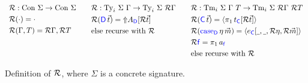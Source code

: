 \begin{figure}[h]
  \[
    \begin{array}[t]{ccc}
      \begin{aligned}[t]
         & \mathcal{R} {}          : \textrm{Con} \ \Sigma  \to \textrm{Con} \ \Sigma \\
         & \mathcal{R} {(\cdot)}     = \cdot                          \\
         & \mathcal{R} {(\Gamma, T)} = \mathcal{R} {\Gamma}, \mathcal{R} {T}
      \end{aligned}                                                             & \quad
      \begin{aligned}[t]
         & \mathcal{R} {}          : \textrm{Ty}_i \ \Sigma \ \Gamma  \to \textrm{Ty}_i \ \Sigma \ \mathcal{R} {\Gamma} \\
         & \mathcal{R} {({\color{blue}{\mathsf{D}}}\,\vec{t})}     = \text{$\Uparrow$}{ A_{{\ensuremath{\color{blue}{\mathsf{D}}}}} [\mathcal{R} {\vec{t}}] }          \\
         & \text{else recurse with $\mathcal{R} {}$}                                              \\
      \end{aligned} \quad &
      \begin{aligned}[t]
         & \mathcal{R} {}          : \textrm{Tm}_i \ \Sigma \ \Gamma \ T  \to \textrm{Tm}_i \ \Sigma \ \mathcal{R} {\Gamma} \ \mathcal{R} {T}           \\
         & \mathcal{R} {({\color{blue}{\mathsf{C}}}\,\vec{t})}     = \langle{\pi_1\, t_{{\ensuremath{\color{blue}{\mathsf{C}}}}} [\mathcal{R} {\vec{t}}]}\rangle                              \\
         & \mathcal{R} {({\color{blue}{\mathsf{\textrm{case}_{D}}}}\,\eta\,\vec{m})}     = \langle{e_{{\ensuremath{\color{blue}{\mathsf{C}}}}} [\underline{\hspace{0.4em}},\underline{\hspace{0.4em}},\mathcal{R} {\eta},\mathcal{R} {\vec{m}}]}\rangle \\
         & \mathcal{R} {{\color{blue}{\mathsf{f}}}}     = \pi_1\, a_{{\color{blue}{\mathsf{f}}}}                                                                  \\
         & \text{else recurse with $\mathcal{R} {}$}                                                                        \\
      \end{aligned}
    \end{array}
  \]
  \caption{Definition of $\mathcal{R} {}$, where $\Sigma$ is a concrete signature.}
  \label{fig:repr-rules}
\end{figure}

